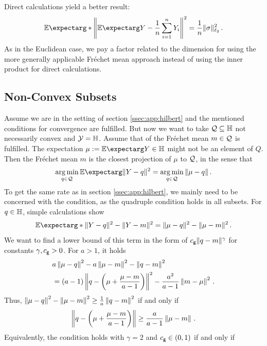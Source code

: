 	Direct calculations yield a better result:
	\begin{equation*}
		\Ex*{\normOf{\Ex{Y}-\frac1n\sum_{i=1}^nY_i}^2} 
		=
		\frac1n \normof{\sigma}_{\ell_2}^2
		\eqfs
	\end{equation*}
	As in the Euclidean case, we pay a factor related to the dimension for using the more generally applicable Fréchet mean approach instead of using the inner product for direct calculations.
%
%
\subsection{Non-Convex Subsets}\label{ssec:app:nonconvex}
%
	Assume we are in the setting of section \ref{ssec:app:hilbert} and the mentioned conditions for convergence are fulfilled.
	But now we want to take $\mathcal{Q} \subseteq \mathbb{H}$ not necessarily convex and $\mathcal{Y} = \mathbb{H}$. Assume that  of the Fréchet mean $m\in\mathcal{Q}$ is fulfilled. The expectation $\mu := \Ex{Y} \in \mb H$ might not be an element of $Q$. Then the Fréchet mean $m$ is the closest projection of $\mu$ to $\mathcal{Q}$, in the sense that
	\begin{align*}
		\argmin_{q\in\mc Q} \Ex{\normof{Y-q}^2} 
		= 
		\argmin_{q\in\mc Q} \normof{\mu-q}
		\eqfs
	\end{align*}
	To get the same rate as in section \ref{ssec:app:hilbert}, we mainly need to be concerned with the  condition, as the quadruple condition holds in all subsets.
	For $q\in\mathbb{H}$, simple calculations show
	\begin{align*}
		\Ex*{\normof{Y-q}^2-\normof{Y-m}^2} 
		=
		\normof{\mu-q}^2-\normof{\mu-m}^2
		\eqfs
	\end{align*}
	We want to find a lower bound of this term in the form of $c_{\mathsf{g}} \Vert q-m \Vert^\gamma$ for constants $\gamma, c_{\mathsf{g}} > 0$.
	For $a>1$, it holds
	\begin{align*}
		&a\left\Vert \mu-q \right\Vert^2-a\left\Vert \mu-m \right\Vert^2 - \left\Vert q-m \right\Vert^2 
		\\&= (a-1)\left\Vert q-\left( \mu+\frac{\mu-m}{a-1} \right) \right\Vert^2 - \frac{a^2}{a-1} \left\Vert m-\mu \right\Vert^2
		\, .
	\end{align*}
	Thus, $\left\Vert \mu-q \right\Vert^2-\left\Vert \mu-m \right\Vert^2 \geq \frac1a\left\Vert q-m \right\Vert^2$ if and only if 
	\begin{equation*}
		\left\Vert q-\left( \mu+\frac{\mu-m}{a-1} \right) \right\Vert \geq \frac{a}{a-1} \left\Vert \mu-m \right\Vert
		\, .
	\end{equation*}
	Equivalently, the  condition holds with $\gamma=2$ and $c_{\mathsf{g}} \in (0,1)$ if and only if

